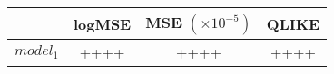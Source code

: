 
\begin{tabular}{l|c|c|c}
    & logMSE & MSE $(\times 10^{-5})$ & QLIKE \\\hline
$model_1$ & ++++ & ++++ & ++++
\end{tabular}